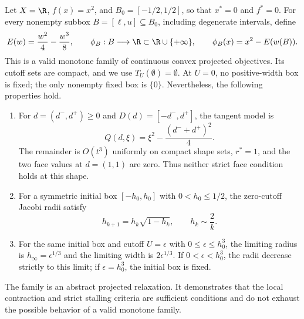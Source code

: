 \begin{example}
\label{ex:critical-scalar}
Let $X=\R$, $f(x)=x^2$, and $B_0=[-1/2,1/2]$, so that
$x^*=0$ and $f^*=0$. For every nonempty subbox $B=[\ell,u]\subseteq B_0$,
including degenerate intervals, define
\begin{equation}\label{eq:critical-relaxation}
  E(w)=\frac{w^2}{4}-\frac{w^3}{8},\qquad
  \phi_B:B\longrightarrow\R\subset\R\cup\{+\infty\},\qquad
  \phi_B(x)=x^2-E(w(B)).
\end{equation}
This is a valid monotone family of continuous convex projected objectives.
Its cutoff sets are compact, and we use $T_U(\emptyset)=\emptyset$.
At $U=0$, no positive-width box is fixed; the only nonempty fixed box is
$\{0\}$. Nevertheless, the following properties hold.
\begin{enumerate}[label=(\alph*)]
\item For $d=(d^-,d^+)\ge0$ and $D(d)=[-d^-,d^+]$, the tangent model is
  \begin{equation}\label{eq:critical-tangent}
    Q(d,\xi)=\xi^2-\frac{(d^-+d^+)^2}{4}.
  \end{equation}
  The remainder is $O(t^3)$ uniformly on compact shape sets, $r^*=1$,
  and the two face values at $d=(1,1)$ are zero. Thus neither strict face
  condition holds at this shape.
\item For a symmetric initial box $[-h_0,h_0]$ with $0<h_0\le1/2$, the
  zero-cutoff Jacobi radii satisfy
  \begin{equation}\label{eq:critical-recurrence}
    h_{k+1}=h_k\sqrt{1-h_k},\qquad h_k\sim\frac{2}{k}.
  \end{equation}
\item For the same initial box and cutoff $U=\epsilon$ with
  $0\le\epsilon\le h_0^3$, the limiting radius is
  $h_\infty=\epsilon^{1/3}$ and the limiting width is
  $2\epsilon^{1/3}$. If $0<\epsilon<h_0^3$, the radii decrease strictly
  to this limit; if $\epsilon=h_0^3$, the initial box is fixed.
\end{enumerate}
The family is an abstract projected relaxation. It demonstrates that the
local contraction and strict stalling criteria are sufficient conditions
and do not exhaust the possible behavior of a valid monotone family.
\end{example}

